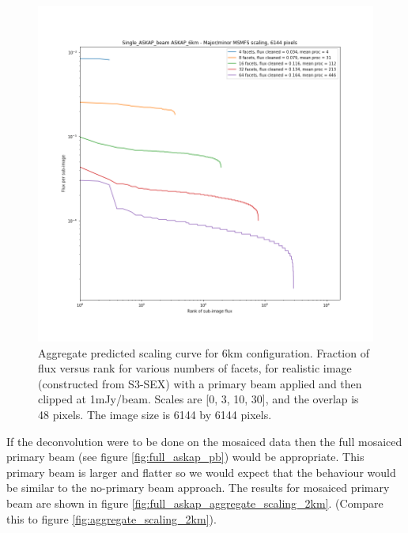 \documentclass[11pt,a4paper,variablewidth]{article}
\begin{document}
\begin{figure}[h]
  \centering
  \includegraphics[width=\textwidth]{./pngs/aggregate_scaling_single_ASKAP_beam_ASKAP_6km_6144.png}
  \caption{Aggregate predicted scaling curve for 6km configuration. Fraction of flux versus rank for various numbers of facets, for realistic image (constructed from S3-SEX) with a primary beam applied and then clipped at 1mJy/beam. Scales are [0, 3, 10, 30], and the overlap is 48 pixels. The image size is 6144 by 6144 pixels.}
  \label{fig:aggregate_scaling_6km}
\end{figure}

If the deconvolution were to be done on the mosaiced data then the full mosaiced primary beam (see figure \ref{fig:full_askap_pb}) would be appropriate. This primary beam is larger and flatter so we would expect that the behaviour would be similar to the no-primary beam approach. The results for mosaiced primary beam are shown in figure \ref{fig:full_askap_aggregate_scaling_2km}. (Compare this to figure \ref{fig:aggregate_scaling_2km}).
\end{document}
